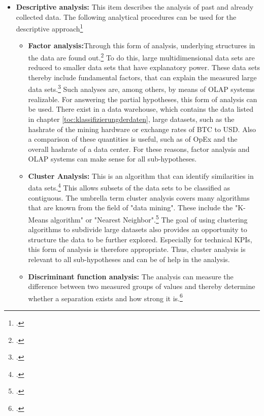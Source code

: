 \begin{itemize}
    \item \textbf{Descriptive analysis: }This item describes the analysis of past and already collected
    data. The following analytical procedures can be used for the descriptive approach\footcite[Cf.][pp. 97]{bihani2014comparative}
    \begin{itemize}
        \item \textbf{Factor analysis:}Through this form of analysis, underlying structures in the data are
        found out.\footcite[Cf.][pp. 97]{bihani2014comparative} To do this, large multidimensional data sets are
        reduced to smaller data sets that have explanatory power. These data sets thereby include
        fundamental factors, that can explain the measured large data sets.\footcite[Cf.][pp. 97]{bihani2014comparative}
        Such analyses are, among others, by means of \ac{OLAP} systems
        realizable. For answering the partial hypotheses, this form of analysis can be used. There exist
        in a data warehouse, which contains the data listed in chapter \ref{toc:klassifizierungderdaten}, large
        datasets, such as the hashrate of the mining hardware or exchange rates of \ac{BTC} to \ac{USD}. Also
        a comparison of these quantities is useful, such as of \ac{OpEx} and the overall hashrate of a data center.
        For these reasons, factor analysis and \ac{OLAP} systems can make sense for all sub-hypotheses.
        \item \textbf{Cluster Analysis: }This is an algorithm that can identify similarities in data sets.\footcite[Cf.][p. 98]{bihani2014comparative}
        This allows subsets of the data sets to be classified as contiguous.
        The umbrella term cluster analysis covers many algorithms that are known from the field of "data mining".
        These include the "K-Means algorithm" or "Nearest Neighbor".\footcite[Cf.][p. 98]{bihani2014comparative}
        The goal of using clustering algorithms to subdivide large datasets also provides an opportunity to structure
        the data to be further explored. Especially for technical \acp{KPI}, this form of analysis is therefore appropriate.
        Thus, cluster analysis is relevant to all sub-hypotheses and can be of help in the analysis. 
        \item \textbf{Discriminant function analysis: }The analysis can measure the difference between two measured groups of values
        and thereby determine whether a separation exists and how strong it is.\footcite[Cf.][p. 98]{bihani2014comparative}

\end{itemize}
\end{itemize}
